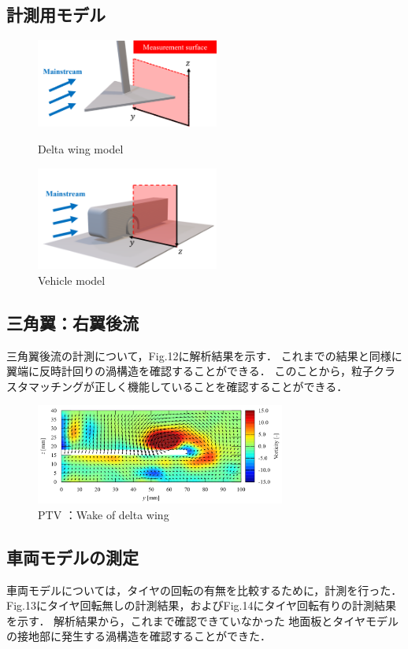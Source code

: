 \documentclass[twocolumn,a4j]{jsarticle}
\begin{document}
\subsection{計測用モデル}
\begin{figure}[htbp]
	\centering
	\includegraphics[keepaspectratio, width=60mm]{../images/delta_wing_model.png}
	\caption{Delta wing model}
	\includegraphics[keepaspectratio, width=60mm]{../images/vehicle_model.png}
	\caption{Vehicle model}
\end{figure}

\newpage
\subsection{三角翼：右翼後流}
三角翼後流の計測について，Fig.12に解析結果を示す．
これまでの結果と同様に翼端に反時計回りの渦構造を確認することができる．
このことから，粒子クラスタマッチングが正しく機能していることを確認することができる．

\begin{figure}[htbp]
	\centering
	\includegraphics[keepaspectratio, width=82mm]{../images/delta_wing.png}
	\caption{PTV ：Wake of delta wing}
\end{figure}

\subsection{車両モデルの測定}
車両モデルについては，タイヤの回転の有無を比較するために，計測を行った．
Fig.13にタイヤ回転無しの計測結果，およびFig.14にタイヤ回転有りの計測結果を示す．
解析結果から，これまで確認できていなかった
地面板とタイヤモデルの接地部に発生する渦構造を確認することができた．
\end{document}

